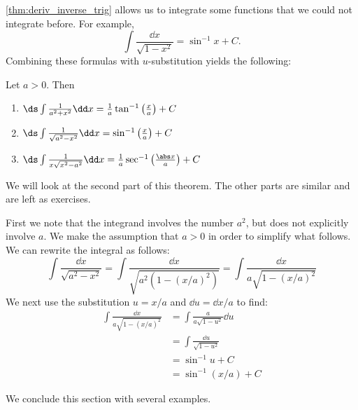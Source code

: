 \autoref{thm:deriv_inverse_trig} allows us to integrate some functions that we could not integrate before. For example,
\[\int\frac{\dd x}{\sqrt{1-x^2}}=\sin^{-1}x+C.\]
Combining these formulas with $u$-substitution yields the following:

{
\begin{theorem}\label{thm:int_inverse_trig}%
Let $a>0$.  Then
\begin{enumerate}
	\item	$\ds\int\frac1{a^2+x^2}\dd x=\frac1a\tan^{-1}\left(\frac xa\right) + C$
	\item	$\ds\int\frac1{\sqrt{a^2-x^2}}\dd x=\sin^{-1}\left(\frac xa\right)+C$
	\item	$\ds\int\frac1{x\sqrt{x^2-a^2}}\dd x=\frac1a\sec^{-1}\left(\frac{\abs x}a\right)+C$
\end{enumerate}
\end{theorem}}

We will look at the second part of this theorem. The other parts are similar and are left as exercises.

First we note that the integrand involves the number $a^2$, but does not explicitly involve $a$. We make the assumption that $a>0$ in order to simplify what follows. We can rewrite the integral as follows:
\[\int\frac{\dd x}{\sqrt{a^2-x^2}}=\int\frac{\dd x}{\sqrt{a^2(1-(x/a)^2)}}=\int\frac{\dd x}{a\sqrt{1-(x/a)^2}}\]
We next use the substitution $u=x/a$ and $\dd u=\dd x/a$ to find: 
\begin{align*}
\int\frac{\dd x}{a\sqrt{1-(x/a)^2}}
&=\int\frac{a}{a\sqrt{1-u^2}}\dd u\\
&=\int \frac{\dd u}{\sqrt{1-u^2}}\\
&=\sin^{-1}u+C\\
&=\sin^{-1}(x/a)+C
\end{align*}

We conclude this section with several examples.

